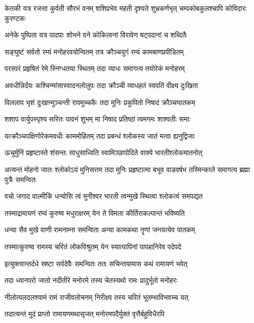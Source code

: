 \threelineshloka
{केतकी यत्र रजसा कुर्वती सौरभं वनम्}
{शशिप्रभेव महती दृश्यते शुभ्रकर्णभृत्}
{चम्पकोबकुलश्चापि कोविदारः कुरण्टकः}%

\twolineshloka
{अनेके पुष्पिता यत्र पादपाः शोभने वने}
{कोकिलानां विरावेण षट्पदानां च शब्दितैः}%

\twolineshloka
{सङ्घुष्टं सर्वतो रम्यं मनोहरवयोन्वितम्}
{तत्र क्रौञ्चयुगं रम्यं कामबाणप्रपीडितम्}%

\twolineshloka
{परस्परं प्रहृषितं रेमे स्निग्धतया स्थितम्}
{तदा व्याधः समागत्य तयोरेकं मनोहरम्}%

\twolineshloka
{अवधीन्निर्दयः कश्चिन्मांसास्वादनलोलुपः}
{तदा क्रौञ्ची व्याधहतं स्वपतिं वीक्ष्य दुःखिता}%

\twolineshloka
{विललाप भृशं दुःखान्मुञ्चन्ती रावमुच्चकैः}
{तदा मुनिः प्रकुपितो निषादं क्रौञ्चघातकम्}%

\twolineshloka
{शशाप वार्युपस्पृश्य सरितः पावनं शुभम्}
{मा निषाद प्रतिष्ठां त्वमगमः शाश्वतीः समाः}%

\twolineshloka
{यत्क्रौञ्चपक्षिणोरेकमवधीः काममोहितम्}
{तदा प्रबन्धं श्लोकस्य जातं मत्वा ह्यनुद्विजाः}%

\twolineshloka
{ऊचुर्मुनिं प्रहृष्टास्ते शंसन्तः साधुसाध्विति}
{स्वामिञ्छापोदिते वाक्ये भारतीश्लोकमातनोत्}%


\threelineshloka
{अत्यन्तं मोहनो जातः श्लोकोऽयं मुनिसत्तम}
{तदा मुनिः प्रहृष्टात्मा बभूव वाडवर्षभ}
{तस्मिन्काले समागत्य ब्रह्मा पुत्रैः समन्वितः}%

\twolineshloka
{वचो जगाद वाल्मीकिं धन्योसि त्वं मुनीश्वर}
{भारती त्वन्मुखे स्थित्वा श्लोकत्वं समपद्यत}%

\twolineshloka
{तस्माद्रामायणं रम्यं कुरुष्व मधुराक्षरम्}
{येन ते विमला कीर्तिराकल्पान्तं भविष्यति}%

\twolineshloka
{धन्या सैव मुखे वाणी रामनाम्ना समन्विता}
{अन्या कामकथा नॄणां जनयत्येव पातकम्}%

\twolineshloka
{तस्मात्कुरुष्व रामस्य चरितं लोकविश्रुतम्}
{येन स्यात्पापिनां पापहानिरेव पदेपदे}%

\twolineshloka
{इत्युक्त्वान्तर्दधे स्रष्टा सर्वदेवैः समन्वितः}
{ततः सचिन्तयामास कथं रामायणं भवेत्}%

\twolineshloka
{तदा ध्यानपरो जातो नदीतीरे मनोरमे}
{तस्य चेतस्यथो रामः प्रादुर्भूतो मनोहरः}%

\twolineshloka
{नीलोत्पलदलश्यामं रामं राजीवलोचनम्}
{निरीक्ष्य तस्य चरितं भूतम्भाविभवच्च यत्}%

\twolineshloka
{तदात्यन्तं मुदं प्राप्तो रामायणमथासृजत्}
{मनोरमपदैर्युक्तं वृत्तैर्बहुविधैरपि}%

